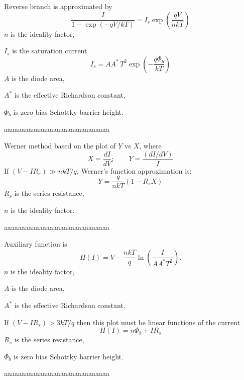 \documentclass[14pt]{article}
\numberwithin{equation}{part}
\begin{document}
\pagebreak

Reverse branch is approximated by
\begin{equation*}
\frac{I}{1-\exp(-qV/kT)}=I_s\exp\left(\frac{qV}{nkT}\right)
\end{equation*}
\noindent
$n$ is the ideality factor,

\noindent
$I_s$ is the saturation current
\begin{equation*}
I_s=AA^*\,T^2\exp\left(-\frac{q\Phi_b}{kT}\right)
\end{equation*}
$A$ is the diode area,

\noindent
$A^*$ is the effective Richardson constant,

\noindent
$\Phi_b$ is zero bias Schottky barrier height.

\vspace{5mm}
aaaaaaaaaaaaaaaaaaaaaaaaaaaaaa
\vspace{5mm}

\noindent
Werner method based on the plot of $Y$ vs $X$, where
\begin{equation*}
X=\frac{dI}{dV};\qquad Y=\frac{(dI/dV)}{I}
\end{equation*}
If $(V-IR_s)\gg nkT/q$, Werner's function approximation is:
\begin{equation*}
Y=\frac{q}{nkT}(1-R_sX)
\end{equation*}
$R_s$ is the series resistance,

\noindent
$n$ is the ideality factor.

\vspace{5mm}
aaaaaaaaaaaaaaaaaaaaaaaaaaaaaa
\vspace{5mm}

Auxiliary  function is
\begin{equation*}
H(I)=V-\frac{nkT}{q}\ln\left(\frac{I}{AA^*T^2}\right).
\end{equation*}
$n$ is the ideality factor,

\noindent
$A$ is the diode area,

\noindent
$A^*$ is the effective Richardson constant.

\noindent If $(V-IR_s)>3kT/q$ then this plot must be linear  functions of the  current
\begin{equation*}
H(I)=n\Phi_b+IR_s
\end{equation*}
$R_s$ is the series resistance,

\noindent
$\Phi_b$ is zero bias Schottky barrier height.


\vspace{5mm}
aaaaaaaaaaaaaaaaaaaaaaaaaaaaaa
\vspace{5mm}
\end{document}
